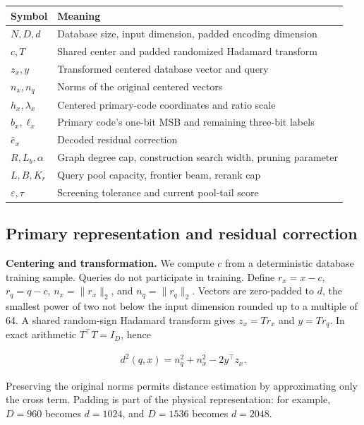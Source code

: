 \par\medskip\noindent\begin{tabularx}{\columnwidth}{>{\raggedright\arraybackslash}X >{\raggedright\arraybackslash}X}
\toprule
Symbol & Meaning \\
\midrule
$N,D,d$ & Database size, input dimension, padded encoding dimension \\
$c,T$ & Shared center and padded randomized Hadamard transform \\
$z_x,y$ & Transformed centered database vector and query \\
$n_x,n_q$ & Norms of the original centered vectors \\
$h_x,\lambda_x$ & Centered primary-code coordinates and ratio scale \\
$b_x,\ell_x$ & Primary code's one-bit MSB and remaining three-bit labels \\
$\widehat e_x$ & Decoded residual correction \\
$R,L_b,\alpha$ & Graph degree cap, construction search width, pruning parameter \\
$L,B,K_r$ & Query pool capacity, frontier beam, rerank cap \\
$\varepsilon,\tau$ & Screening tolerance and current pool-tail score \\
\bottomrule
\end{tabularx}
\par\medskip

\subsection{Primary representation and residual correction}

\textbf{Centering and transformation.} We compute $c$ from a deterministic database training sample. Queries do not participate in training. Define $r_x=x-c$, $r_q=q-c$, $n_x=\|r_x\|_2$, and $n_q=\|r_q\|_2$. Vectors are zero-padded to $d$, the smallest power of two not below the input dimension rounded up to a multiple of 64. A shared random-sign Hadamard transform gives $z_x=Tr_x$ and $y=Tr_q$. In exact arithmetic $T^\top T=I_D$, hence

\begin{equation}
\begin{gathered}
d^2(q,x)=n_q^2+n_x^2-2y^\top z_x.
\end{gathered}
\end{equation}

Preserving the original norms permits distance estimation by approximating only the cross term. Padding is part of the physical representation: for example, $D=960$ becomes $d=1024$, and $D=1536$ becomes $d=2048$.

